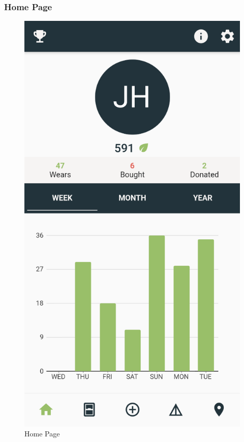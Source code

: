 \documentclass[a4paper, 11pt]{article}
\begin{document}
    \newpage
      \subsubsection{Home Page}
        \begin{figure}
            \centering
            \includegraphics[scale=0.3]{home-page.png}
            \caption{Home Page}
        \end{figure}
\end{document}
